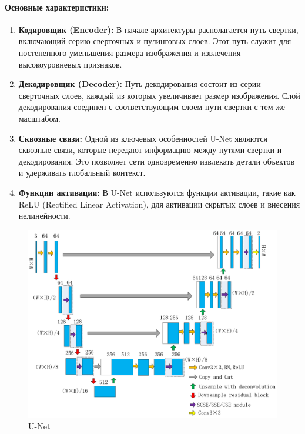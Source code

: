 \documentclass[11pt]{article}
\providecommand{\tightlist}{%
      \setlength{\itemsep}{0pt}\setlength{\parskip}{0pt}}
\begin{document}
\hypertarget{ux43eux441ux43dux43eux432ux43dux44bux435-ux445ux430ux440ux430ux43aux442ux435ux440ux438ux441ux442ux438ux43aux438}{%
\paragraph{Основные
характеристики:}\label{ux43eux441ux43dux43eux432ux43dux44bux435-ux445ux430ux440ux430ux43aux442ux435ux440ux438ux441ux442ux438ux43aux438}}

\begin{enumerate}
\def\labelenumi{\arabic{enumi}.}
\tightlist
\item
  \textbf{Кодировщик (Encoder):} В начале архитектуры располагается путь
  свертки, включающий серию сверточных и пулинговых слоев. Этот путь
  служит для постепенного уменьшения размера изображения и извлечения
  высокоуровневых признаков.
\item
  \textbf{Декодировщик (Decoder):} Путь декодирования состоит из серии
  сверточных слоев, каждый из которых увеличивает размер изображения.
  Слой декодирования соединен с соответствующим слоем пути свертки с тем
  же масштабом.
\item
  \textbf{Сквозные связи:} Одной из ключевых особенностей U-Net являются
  сквозные связи, которые передают информацию между путями свертки и
  декодирования. Это позволяет сети одновременно извлекать детали
  объектов и удерживать глобальный контекст.
\item
  \textbf{Функции активации:} В U-Net используются функции активации,
  такие как ReLU (Rectified Linear Activation), для активации скрытых
  слоев и внесения нелинейности.
\end{enumerate}

\begin{figure}
\centering
\includegraphics{../resources/u-net-architecture.png}
\caption{U-Net}
\end{figure}
\end{document}
